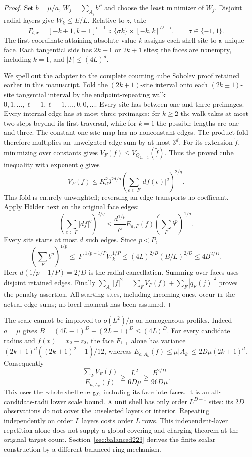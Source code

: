 \begin{proof}
Set $b=\mu/a$, $W_j=\sum_{A_j}b^P$ and choose the least minimizer of
$W_j$. Disjoint radial layers give $W_k\le B/L$. Relative to $z$, take
\[
 F_{i,\sigma}=[-k+1,k-1]^{i-1}\times\{\sigma k\}
                 \times[-k,k]^{D-i},\qquad \sigma\in\{-1,1\}.
\]
The first coordinate attaining absolute value $k$ assigns each shell site
to a unique face. Each tangential side has $2k-1$ or $2k+1$ sites;
the faces are nonempty, including $k=1$, and $|F|\le(4L)^d$.

We spell out the adapter to the complete counting cube Sobolev proof
retained earlier in this manuscript. Fold the $(2k+1)$-site interval
onto each $(2k\pm1)$-site tangential interval by the endpoint-repeating
walk $0,1,\ldots,\ell-1,\ell-1,\ldots,0,0,\ldots$.
Every site has between one and three preimages. Every internal edge has
at most three preimages: for $k\ge2$ the walk takes at most two steps
beyond its first traversal, while for $k=1$ the possible lengths are
one and three. The constant one-site map has no nonconstant edges.
The product fold therefore multiplies an unweighted edge sum by at most
$3^d$. For its extension $\widetilde f$, minimizing over constants gives
$V_F(f)\le V_{Q_{2k+1}}(\widetilde f)$. Thus the proved cube inequality
with exponent $q$ gives
\[
 V_F(f)\le K_d^2 3^{2d/q}
                 \left(\sum_{e\subset F}|df(e)|^q\right)^{2/q}.
\]
This fold is entirely unweighted; reversing an edge transports no
coefficient. Apply H\"older next on the original face edges:
\[
 \left(\sum_{e\subset F}|df|^q\right)^{2/q}
 \le\frac{d^{1/p}}\mu E_{a,F}(f)
               \left(\sum_F b^p\right)^{1/p}.
\]
Every site starts at most $d$ such edges. Since $p<P$,
\[
 \left(\sum_Fb^p\right)^{1/p}
 \le |F|^{1/p-1/P}W_k^{1/P}
 \le(4L)^{2/D}(B/L)^{2/D}\le4B^{2/D}.
\]
Here $d(1/p-1/P)=2/D$ is the radial cancellation. Summing over faces
uses disjoint retained edges. Finally
$\sum_{A_k}|f|^2=\sum_FV_F(f)+\sum_F|q_F(f)|^2$ proves the penalty
assertion. All starting sites, including incoming ones, occur in the
actual edge sums; no local moment has been assumed.
\end{proof}

The scale cannot be improved to $o(L^2)/\mu$ on homogeneous profiles.
Indeed $a=\mu$ gives $B=(4L-1)^D-(2L-1)^D\le(4L)^D$.
For every candidate radius and $f(x)=x_2-z_2$, the face $F_{1,+}$
alone has variance $(2k+1)^d((2k+1)^2-1)/12$, whereas
$E_{a,A_k}(f)\le\mu|A_k|\le2D\mu(2k+1)^d$. Consequently
\[
 \frac{\sum_FV_F(f)}{E_{a,A_k}(f)}
 \ge\frac{L^2}{6D\mu}\ge\frac{B^{2/D}}{96D\mu}.
\]
This uses the whole shell energy, including its face interfaces. It is
an all-candidate-radii lower scale bound. A unit shell has only order
$L^{D-1}$ sites: its $2D$ observations do not cover the unselected
layers or interior. Repeating independently on order $L$ layers costs
order $L$ rows. This independent-layer repetition alone does not supply
a global covering and charging theorem at the original target count.
Section~\ref{sec:balanced223} derives the finite scalar construction by
a different balanced-ring mechanism.

